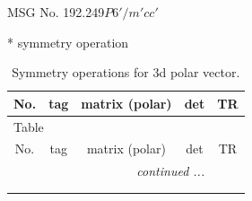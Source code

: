 \documentclass[fleqn,8pt]{jsarticle}
\begin{document}
\setcounter{MaxMatrixCols}{32}

\renewcommand{\tablename}{Table~}
\renewcommand{\figurename}{Figure~}
\begin{center}
\LARGE
MSG No. 192.249\quad$P6'/m'cc'$
\end{center}
* symmetry operation
\renewcommand{\arraystretch}{1.3}
\begin{longtable}{ccccc}
\caption{Symmetry operations for 3d polar vector.}
 \\
 \hline \hline
No. & tag & matrix (polar) & det & TR \\ \hline \endfirsthead

\multicolumn{4}{l}{\tablename\ \thetable{}} \\
 \hline \hline
No. & tag & matrix (polar) & det & TR \\ \hline \endhead

 \hline \hline
\multicolumn{4}{r}{\footnotesize\it continued ...} \\ \endfoot

 \hline \hline
\multicolumn{4}{r}{} \\ \endlastfoot


\end{longtable}
\end{document}
